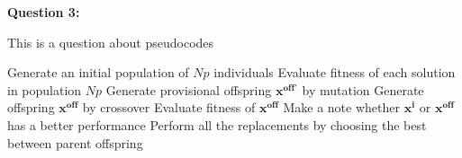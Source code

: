 \documentclass[11pt,a4paper,twoside]{article}
\begin{document}
\noindent\textbf{Question 3: } 
\begin{flushright}\end{flushright}
This is a question about pseudocodes

\begin{algorithm}\caption{General Differential Evolution Framework} %
\begin{algorithmic}[1]
		\STATE Generate an initial population of $Np$ individuals
    \STATE Evaluate fitness of each solution in population $Np$
      \STATE Generate provisional offspring $\mathbf{x^{off'}}$ by mutation
      \STATE Generate offspring $\mathbf{x^{off}}$ by crossover
		  \STATE Evaluate fitness of $\mathbf{x^{off}}$
      \STATE Make a note whether $\mathbf{x^i}$ or $\mathbf{x^{off}}$ has a better performance
    \ENDFOR
    \STATE Perform all the replacements by choosing the best between parent offspring
     \ENDFOR
    \ENDWHILE
\end{algorithmic}
\end{algorithm}
\newpage
\setlength{\fboxrule}{2.8pt} 
\thispagestyle{lastpage}%
\end{document}
